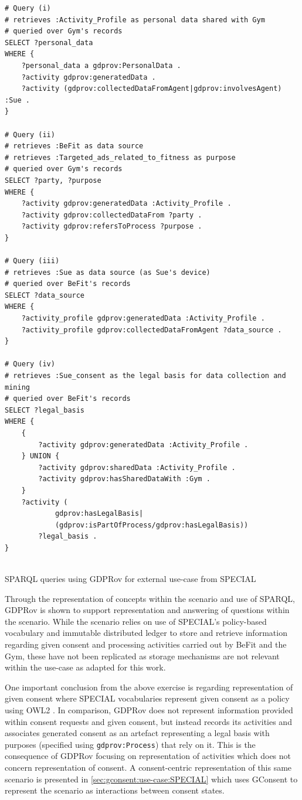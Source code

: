 \begin{listing}[htbp]
\begin{verbatim}
# Query (i)
# retrieves :Activity_Profile as personal data shared with Gym
# queried over Gym's records
SELECT ?personal_data 
WHERE {
    ?personal_data a gdprov:PersonalData .
    ?activity gdprov:generatedData .
    ?activity (gdprov:collectedDataFromAgent|gdprov:involvesAgent) :Sue .
}

# Query (ii)
# retrieves :BeFit as data source
# retrieves :Targeted_ads_related_to_fitness as purpose
# queried over Gym's records
SELECT ?party, ?purpose 
WHERE {
    ?activity gdprov:generatedData :Activity_Profile .
    ?activity gdprov:collectedDataFrom ?party .
    ?activity gdprov:refersToProcess ?purpose .
}

# Query (iii)
# retrieves :Sue as data source (as Sue's device)
# queried over BeFit's records
SELECT ?data_source 
WHERE {
    ?activity_profile gdprov:generatedData :Activity_Profile .
    ?activity_profile gdprov:collectedDataFromAgent ?data_source .   
}

# Query (iv)
# retrieves :Sue_consent as the legal basis for data collection and mining
# queried over BeFit's records
SELECT ?legal_basis 
WHERE {
    {
        ?activity gdprov:generatedData :Activity_Profile .
    } UNION {
        ?activity gdprov:sharedData :Activity_Profile .
        ?activity gdprov:hasSharedDataWith :Gym .
    }
    ?activity (
            gdprov:hasLegalBasis|
            (gdprov:isPartOfProcess/gdprov:hasLegalBasis))
        ?legal_basis .
}


\end{verbatim}
\caption{SPARQL queries using GDPRov for external use-case from SPECIAL}
\label{code:gdprov:use-case:special-sparql}
\end{listing}

Through the representation of concepts within the scenario and use of SPARQL, GDPRov is shown to support representation and answering of questions within the scenario. While the scenario relies on use of SPECIAL's policy-based vocabulary and immutable distributed ledger to store and retrieve information regarding given consent and processing activities carried out by BeFit and the Gym, these have not been replicated as storage mechanisms are not relevant within the use-case as adapted for this work.

One important conclusion from the above exercise is regarding representation of given consent where SPECIAL vocabularies represent given consent as a policy using OWL2 \cite{kirrane_scalable_2018}.
In comparison, GDPRov does not represent information provided within consent requests and given consent, but instead records its activities and associates generated consent as an artefact representing a legal basis with purposes (specified using \texttt{gdprov:Process}) that rely on it. 
This is the consequence of GDPRov focusing on representation of activities which does not concern representation of consent.
A consent-centric representation of this same scenario is presented in \autoref{sec:gconsent:use-case:SPECIAL} which uses GConsent to represent the scenario as interactions between consent states.

